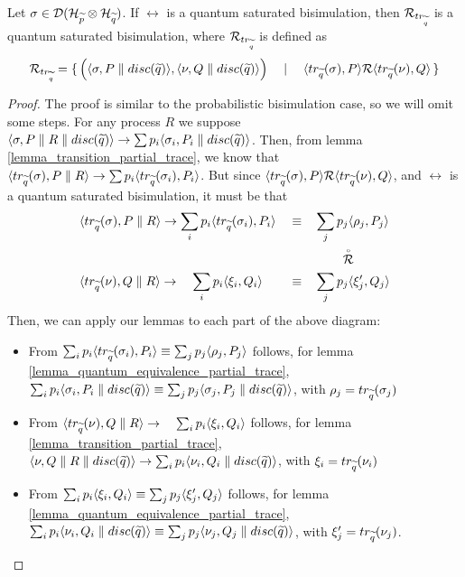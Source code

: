 \begin{lemma}\label{lemma_reltrq_quantum}
Let $\sigma \in \mathcal{D}(\mathcal{H}_{\widetilde{p}} \otimes \mathcal{H}_{\widetilde{q}})$. If $\rel$ is a quantum saturated bisimulation, then $\mathcal{R}_{tr_{\widetilde{q}}}$ is a quantum saturated bisimulation, where $\mathcal{R}_{tr_{\widetilde{q}}}$ is defined as
\[\mathcal{R}_{tr_{\widetilde{q}}} = \set{\Big(\langle\sigma, P \parallel disc(\widetilde{q})\rangle, \langle\nu, Q \parallel disc(\widetilde{q})\rangle\Big) \quad\mid\quad \langle tr_{\widetilde{q}}(\sigma), P\rangle \mathcal{R}\langle tr_{\widetilde{q}}(\nu), Q\rangle}\]
\end{lemma}
\begin{proof}
The proof is similar to the probabilistic bisimulation case, so we will omit some steps.
For any process $R$ we suppose $\langle\sigma, P \parallel R \parallel disc(\widetilde{q})\rangle \rightarrow \sum p_i \langle\sigma_i, P_i \parallel disc(\widetilde{q})\rangle$. Then, from lemma \ref{lemma_transition_partial_trace}, we know that $\langle tr_{\widetilde{q}}(\sigma), P\parallel R\rangle \rightarrow \sum p_i \langle tr_{\widetilde{q}}(\sigma_i), P_i\rangle$. But since $\langle tr_{\widetilde{q}}(\sigma), P\rangle \mathcal{R} \langle tr_{\widetilde{q}}(\nu), Q\rangle$, and $\rel$ is a quantum saturated bisimulation, it must be that 
\begin{align*}
& \langle tr_{\widetilde{q}}(\sigma), P\parallel R\rangle \rightarrow \sum_i p_i \langle tr_{\widetilde{q}}(\sigma_i), P_i\rangle & & \equiv  &  & \sum_j p_j \langle\rho_j, P_j\rangle 
\\
 & & & & & \qquad\stackrel{\scriptscriptstyle \circ}{\mathcal{R}} 
\\
& \langle tr_{\widetilde{q}}(\nu), Q\parallel R\rangle \rightarrow \quad\sum_i p_i \langle\xi_i, Q_i\rangle & & \equiv & &  \sum_j p_j \langle\xi'_j, Q_j\rangle 
\end{align*} 
Then, we can apply our lemmas to each part of the above diagram: \begin{itemize}
\item From $\sum_i p_i \langle tr_{\widetilde{q}}(\sigma_i), P_i\rangle \equiv \sum_j p_j \langle\rho_j, P_j\rangle$ follows, for lemma \ref{lemma_quantum_equivalence_partial_trace}, $\sum_i p_i \langle\sigma_i, P_i\parallel disc(\widetilde{q})\rangle \equiv  \sum_j p_j \langle\sigma_j, P_j\parallel disc(\widetilde{q})\rangle$, with $\rho_j = tr_{\widetilde{q}}(\sigma_j)$
\item From $\langle tr_{\widetilde{q}}(\nu), Q\parallel R\rangle \rightarrow \quad\sum_i p_i \langle\xi_i, Q_i\rangle$ follows, for lemma \ref{lemma_transition_partial_trace}, $\langle\nu, Q\parallel R\parallel disc(\widetilde{q})\rangle \rightarrow \sum_i p_i \langle\nu_i, Q_i\parallel disc(\widetilde{q})\rangle$, with $\xi_i = tr_{\widetilde{q}}(\nu_i)$
\item From $\sum_i p_i \langle\xi_i, Q_i\rangle \equiv  \sum_j p_j \langle\xi'_j, Q_j\rangle$ follows, for lemma \ref{lemma_quantum_equivalence_partial_trace}, $\sum_i p_i \langle\nu_i, Q_i\parallel disc(\widetilde{q})\rangle \equiv  \sum_j p_j \langle\nu_j, Q_j\parallel disc(\widetilde{q})\rangle$, with $\xi'_j = tr_{\widetilde{q}}(\nu_j)$. 

\end{itemize}
\end{proof}
